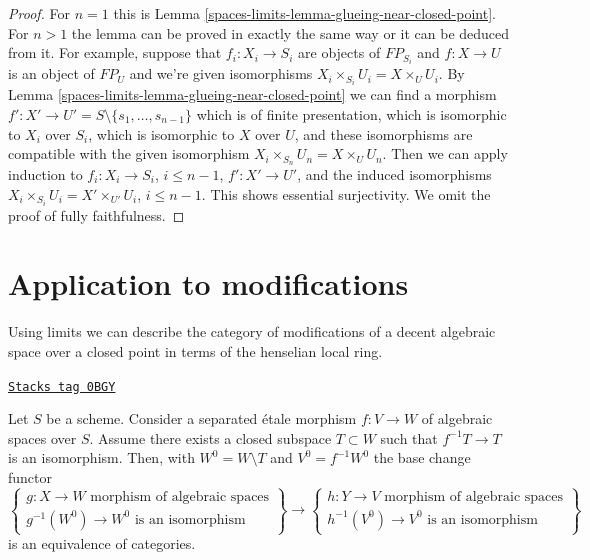 \begin{proof}
For $n = 1$ this is Lemma \ref{spaces-limits-lemma-glueing-near-closed-point}.
For $n > 1$ the lemma can be proved in exactly the same way or it
can be deduced from it. For example, suppose that $f_i : X_i \to S_i$
are objects of $FP_{S_i}$ and $f : X \to U$ is an object
of $FP_U$ and we're given isomorphisms $X_i \times_{S_i} U_i = X \times_U U_i$.
By Lemma \ref{spaces-limits-lemma-glueing-near-closed-point} we can find
a morphism $f' : X' \to U' = S \setminus \{s_1, \ldots, s_{n - 1}\}$
which is of finite presentation, which is isomorphic to
$X_i$ over $S_i$, which is isomorphic to $X$ over $U$, and
these isomorphisms are compatible with the given isomorphism
$X_i \times_{S_n} U_n = X \times_U U_n$.
Then we can apply induction to
$f_i : X_i \to S_i$, $i \leq n - 1$,
$f' : X' \to U'$, and the induced
isomorphisms $X_i \times_{S_i} U_i = X' \times_{U'} U_i$, $i \leq n - 1$.
This shows essential surjectivity. We omit the proof of
fully faithfulness.
\end{proof}

\section{Application to modifications}
\label{spaces-limits-section-modifications-at-a-point}
Using limits we can describe the category of modifications of
a decent algebraic space over a closed point in terms of the
henselian local ring.

\begin{lemma}
\label{spaces-limits-lemma-excision-modifications}
\href{https://stacks.math.columbia.edu/tag/0BGY}{\texttt{Stacks tag 0BGY}}

Let $S$ be a scheme. Consider a separated \'etale morphism
$f : V \to W$ of algebraic spaces over $S$.
Assume there exists a
closed subspace $T \subset W$ such that $f^{-1}T \to T$ is
an isomorphism. Then, with $W^0 = W \setminus T$ and
$V^0 = f^{-1}W^0$ the base change functor
$$
\left\{
\begin{matrix}
g : X \to W\text{ morphism of algebraic spaces} \\
g^{-1}(W^0) \to W^0\text{ is an isomorphism}
\end{matrix}
\right\}
\longrightarrow
\left\{
\begin{matrix}
h : Y \to V\text{ morphism of algebraic spaces} \\
h^{-1}(V^0) \to V^0\text{ is an isomorphism}
\end{matrix}
\right\}
$$
is an equivalence of categories.
\end{lemma}

